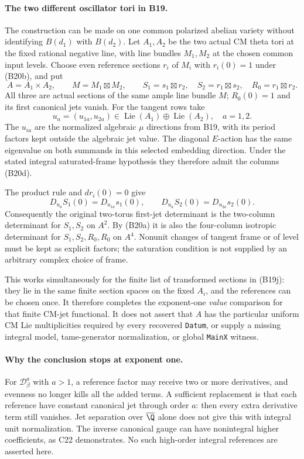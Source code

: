 \paragraph{The two different oscillator tori in B19.}
The construction can be made on one common polarized abelian
variety without identifying $B(d_1)$ with $B(d_2)$.
Let $A_1,A_2$ be the two actual CM theta tori at the fixed
rational negative line, with line bundles $M_1,M_2$ at the
chosen common input levels.  Choose even reference sections
$r_i$ of $M_i$ with $r_i(0)=1$ under (B20b), and put
\[
 A=A_1\times A_2,\qquad M=M_1\boxtimes M_2,
 \qquad S_1=s_1\boxtimes r_2,
 \quad S_2=r_1\boxtimes s_2,
 \quad R_0=r_1\boxtimes r_2.
 \tag{B20e}
\]
All three are actual sections of the same ample line bundle
$M$; $R_0(0)=1$ and its first canonical jets vanish.
For the tangent rows take
\[
             u_a=(u_{1a},u_{2a})\in
                          \operatorname{Lie}(A_1)\oplus
                          \operatorname{Lie}(A_2),\quad a=1,2.
\]
The $u_{ia}$ are the normalized algebraic $\mu$ directions
from B19, with its period factors kept outside the algebraic
jet value.  The diagonal $E$-action has the same eigenvalue
on both summands in this selected embedding direction.
Under the stated integral saturated-frame hypothesis they
therefore admit the columns (B20d).

The product rule and $dr_i(0)=0$ give
\[
       D_{u_a}S_1(0)=D_{u_{1a}}s_1(0),\qquad
       D_{u_a}S_2(0)=D_{u_{2a}}s_2(0).
\]
Consequently the original two-torus first-jet determinant is
the two-column determinant for $S_1,S_2$ on $A^2$.
By (B20a) it is also the four-column isotropic determinant
for $S_1,S_2,R_0,R_0$ on $A^4$.  Nonunit changes of tangent
frame or of level must be kept as explicit factors; the
saturation condition is not supplied by an arbitrary
complex choice of frame.

This works simultaneously for the finite list of transformed
sections in (B19j): they lie in the same finite section spaces
on the fixed $A_i$, and the references can be chosen once.
It therefore completes the exponent-one \emph{value} comparison
for that finite CM-jet functional.  It does not assert that
$A$ has the particular uniform CM Lie multiplicities required
by every recovered \texttt{Datum}, or supply a missing
integral model, tame-generator normalization, or global
\texttt{MainX} witness.

\paragraph{Why the conclusion stops at exponent one.}
For $\mathcal D_\beta^{a}$ with $a>1$, a reference factor
may receive two or more derivatives, and evenness no longer
kills all the added terms.  A sufficient replacement is that
each reference have constant canonical jet through order $a$:
then every extra derivative term still vanishes.  Jet separation
over $\overline\Q$ alone does not give this with integral unit
normalization.  The inverse canonical gauge can have
nonintegral higher coefficients, as C22 demonstrates.
No such high-order integral references are asserted here.

